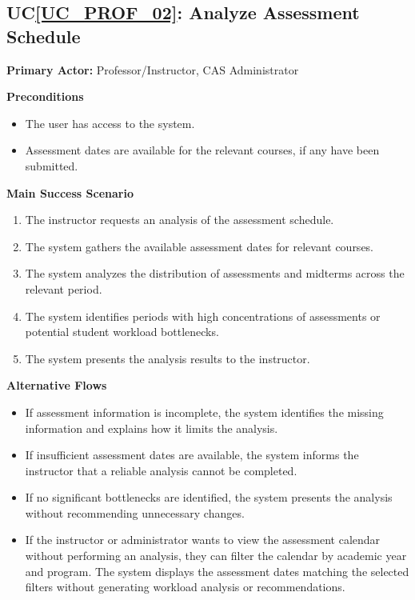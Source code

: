 \documentclass[12pt]{article}
\newcounter{ucnum} %
\newcommand{\ucref}[1]{UC\ref{#1}}
\begin{document}
 \label{UC_PROF_02}
\subsection{\ucref{UC_PROF_02}: Analyze Assessment Schedule}

\noindent \textbf{Primary Actor:} Professor/Instructor, CAS Administrator

\noindent \textbf{Preconditions}
\begin{itemize}
  \item The user has access to the system.
  \item Assessment dates are available for the relevant courses, if any have been submitted.
\end{itemize}

\noindent \textbf{Main Success Scenario}
\begin{enumerate}
  \item The instructor requests an analysis of the assessment schedule.
  \item The system gathers the available assessment dates for relevant courses.
  \item The system analyzes the distribution of assessments and midterms across the relevant period.
  \item The system identifies periods with high concentrations of assessments or potential student workload bottlenecks.
  \item The system presents the analysis results to the instructor.
\end{enumerate}

\noindent \textbf{Alternative Flows}
\begin{itemize}
  \item If assessment information is incomplete, the system identifies the missing information and explains how it limits the analysis.
  \item If insufficient assessment dates are available, the system informs the instructor that a reliable analysis cannot be completed.
  \item If no significant bottlenecks are identified, the system presents the analysis without recommending unnecessary changes.
  \item If the instructor or administrator wants to view the assessment calendar without performing an analysis, they can filter the calendar by academic year and program. The system displays the assessment dates matching the selected filters without generating workload analysis or recommendations.
\end{itemize}
\end{document}

